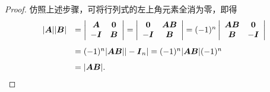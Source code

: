 \begin{proof}
  仿照上述步骤，可将行列式的左上角元素全消为零，即得
  $$
  \begin{array}{rl}
    |\MA||\MB| &  = \left|
               \begin{array}{cc}
                 \MA & \M0\\
                 -\MI & \MB
               \end{array}
                        \right|  = \left|
                        \begin{array}{cc}
                          \M0 & \MA\MB \\
                          -\MI & \MB
                        \end{array}
                                 \right| = (-1)^n\left|
                                 \begin{array}{cc}
                                   \MA\MB & \M0\\
                                   \MB   & -\MI
                                 \end{array}
                                          \right| \\[0.2in]
             &  = (-1)^n |\MA\MB||-\MI_n|  = (-1)^n |\MA\MB|(-1)^n \\[0.1in]
             &  = |\MA\MB|.  
  \end{array}
  $$
\end{proof}  %

